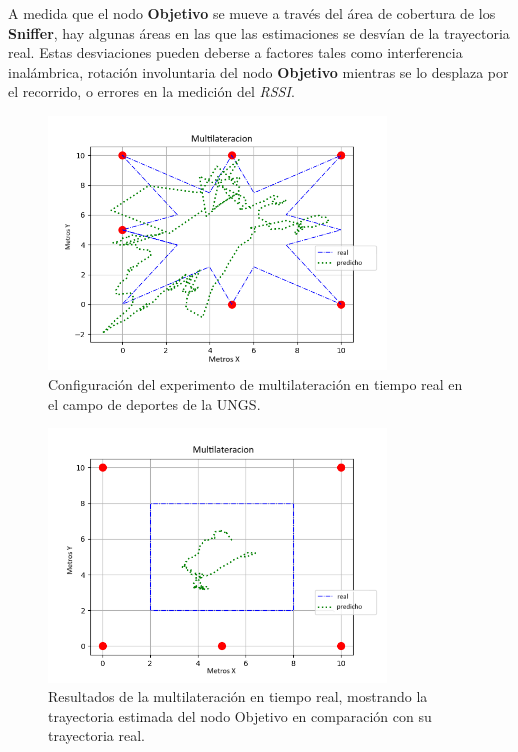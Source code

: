 A medida que el nodo \textbf{Objetivo} se mueve a través del área de cobertura de los \textbf{Sniffer}, hay algunas áreas en las que las estimaciones se desvían de la trayectoria real. Estas desviaciones pueden deberse a factores tales como interferencia inalámbrica, rotación involuntaria del nodo \textbf{Objetivo} mientras se lo desplaza por el recorrido, o errores en la medición del \textit{RSSI}.


\begin{figure}[!htb]
\centering
\includegraphics[width=0.8\textwidth]{Figuras/multilateration/multilateration_star.png}
\captionsetup{margin=2cm}
\caption[Configuración de la Multilateración en Tiempo Real]{Configuración del experimento de multilateración en tiempo real en el campo de deportes de la UNGS.}
\label{fig:real-multilateration}
\end{figure}

\begin{figure}[!htb]
\centering
\includegraphics[width=0.8\textwidth]{Figuras/multilateration/multilateration_square.png}
\captionsetup{margin=2cm}
\caption[Resultados de la Multilateración en Tiempo Real]{Resultados de la multilateración en tiempo real, mostrando la trayectoria estimada del nodo Objetivo en comparación con su trayectoria real.}
\label{fig:real-multilateration-results}
\end{figure}